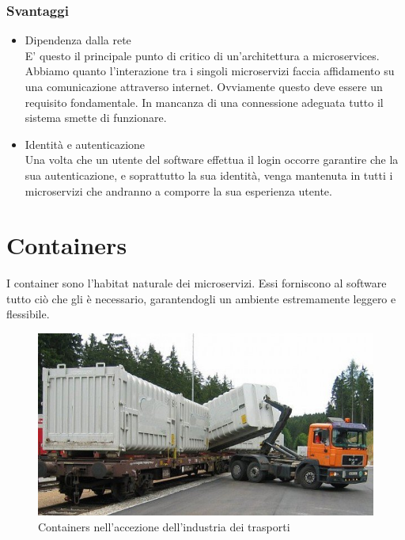\subsubsection{Svantaggi}
\begin{itemize}
	\item Dipendenza dalla rete \\
	E' questo il principale punto di critico di un'architettura a microservices. Abbiamo quanto l'interazione tra i singoli microservizi faccia affidamento su una comunicazione attraverso internet. Ovviamente questo deve essere un requisito fondamentale. In mancanza di una connessione adeguata tutto il sistema smette di funzionare.
	
	\item Identità e autenticazione \\
	Una volta che un utente del software effettua il login occorre garantire che la sua autenticazione, e soprattutto la sua identità, venga mantenuta in tutti i microservizi che andranno a comporre la sua esperienza utente.
\end{itemize}

\section{Containers}
I container sono l'habitat naturale dei microservizi. Essi forniscono al software tutto ciò che gli è necessario, garantendogli un ambiente estremamente leggero e flessibile.

\begin{figure}[h!]
	\centering
	\includegraphics[width=\textwidth,keepaspectratio=true]{capitoli/imgs/spostamentocontainer.png}
	\caption{Containers nell'accezione dell'industria dei trasporti}
\end{figure}



